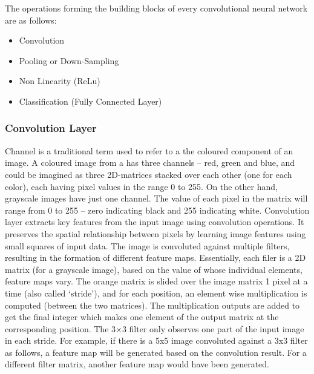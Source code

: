 The operations forming the building blocks of every convolutional neural network are as follows:
\begin{itemize}
\item Convolution
\item Pooling or Down-Sampling
\item Non Linearity (ReLu)
\item Classification (Fully Connected Layer)
\end{itemize}

\subsubsection*{Convolution Layer}
\label{sect5_1_2_1a_a}
Channel is a traditional term used to refer to a the coloured component of an image. A coloured image from a has three channels – red, green and blue, and could be imagined as three 2D-matrices stacked over each other (one for each color), each having pixel values in the range 0 to 255.\newline\newline
On the other hand, grayscale images have just one channel. The value of each pixel in the matrix will range from 0 to 255 – zero indicating black and 255 indicating white. Convolution layer extracts key features from the input image using convolution operations. It preserves the spatial relationship between pixels by learning image features using small squares of input data.\newline\newline
The image is convoluted against multiple filters, resulting in the formation of different feature maps. Essentially, each filer is a 2D matrix (for a grayscale image), based on the value of whose individual elements, feature maps vary. \newline\newline
The orange matrix is slided over the image matrix 1 pixel  at a time (also called ‘stride’), and for each position, an element wise multiplication is computed (between the two matrices). The multiplication outputs are added to get the final integer which makes one element of the output matrix at the corresponding position. The 3×3 filter only observes one part of the input image in each stride.\newline\newline
For example, if there is a 5x5 image convoluted against a 3x3 filter as follows, a feature map will be generated based on the convolution result. For a different filter matrix, another feature map would have been generated.\newline\newline
